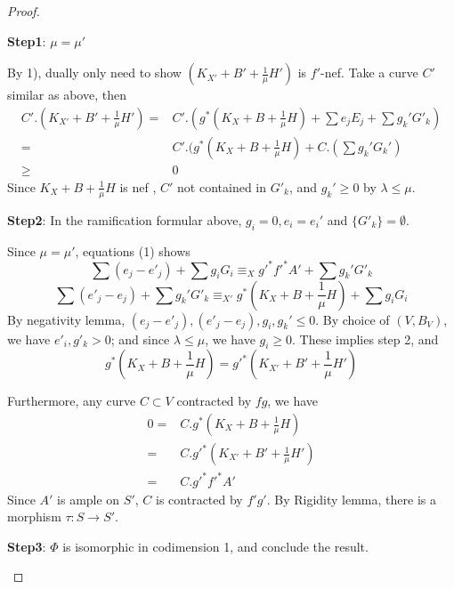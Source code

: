 \documentclass{article}
\begin{document}
\begin{proof}
\begin{enumerate}
		\textbf{Step1}: $ \mu=\mu' $
		
		By 1), dually only need to show $ (K_{X'}+B'+\frac{1}{\mu}H') $ is $ f' $-nef. Take a curve $ C' $ similar as above, then 
		\begin{equation*}
			\begin{aligned}
				C'.(K_{X'}+B'+\frac{1}{\mu}H')=&C'.(g^*(K_{X}+B+\frac{1}{\mu}H)+\sum e_jE_j+ \sum g_k'G'_k)\\
				=&C'.(g^*(K_{X}+B+\frac{1}{\mu}H)+C.(\sum g_k'G_k')\\
				\geqslant&0
			\end{aligned}
		\end{equation*}
		Since $ K_{X}+B+\frac{1}{\mu}H $ is nef , $ C' $ not contained in $ G'_k $, and $ g_k'\geqslant 0 $ by $ \lambda\leqslant \mu. $
		
		\textbf{Step2}: In the ramification formular above, $ g_i=0, e_i=e_i' $ and $ \{G'_k\}=\emptyset $.
		
		Since $ \mu=\mu' $, equations (1) shows
		$$ \sum(e_j-e'_j)+\sum g_iG_i\equiv_X g'^*f'^*A'+\sum g_k'G'_k $$
		$$ \sum(e'_j-e_j)+\sum g_k'G'_k\equiv_{X'} g^*(K_{X}+B+\frac{1}{\mu}H)+\sum g_iG_i $$
		By negativity lemma, $ (e_j-e'_j), (e'_j-e_j), g_i,g_k'\leqslant 0$. By choice of $ (V,B_V) $, we have $ e'_i,g'_k>0 $; and since $\lambda\leqslant\mu$, we have $ g_i\geqslant 0 $. These implies step 2, and 
		$$ g^*(K_{X}+B+\frac{1}{\mu}H)=g'^*(K_{X'}+B'+\frac{1}{\mu}H') $$
		
		Furthermore, any curve $ C\subset V $ contracted by $ fg $, we have
		\begin{equation*}
			\begin{aligned}
				0=&C.g^*(K_{X}+B+\frac{1}{\mu}H)\\
				=&C.g'^*(K_{X'}+B'+\frac{1}{\mu}H') \\
				=&C.g'^*f'^*A'
			\end{aligned}
		\end{equation*}
		Since $ A' $ is ample on $ S' $, $ C $ is contracted by $ f'g' $. By Rigidity lemma, there is a morphism $ \tau:S\to S' $.
		
		\textbf{Step3}: $ \Phi $ is isomorphic in codimension 1, and conclude the result.
		

\end{enumerate}
\end{proof}
\end{document}
